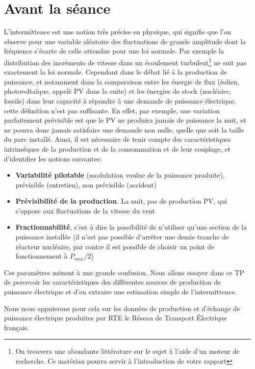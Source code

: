 \documentclass[12pt,a4,french]{article}
\begin{document}
\section{Avant la séance}
\label{sec:avant}
L'intermittence est une notion très précise en physique, qui signifie que
l'on observe pour une variable aléatoire des fluctuations de grande amplitude dont la fréquence s'écarte de celle attendue pour une loi normale. Par exemple la distribution des incréments de vitesse dans un écoulement turbulent\footnote{On trouvera une abondante littérature sur le sujet à l'aide d'un moteur de recherche. Ce matériau pourra servir à l'introduction de votre rapport} ne suit pas exactement la loi normale.
Cependant dans le débat lié à
la production de puissance, et notamment dans la comparaison entre les
énergie de flux (éolien, photovoltaïque, appelé PV dans la suite) et les énergies de stock (nucléaire,
fossile) dans leur capacité à répondre à une demande de puissance
électrique, cette définition n'est pas suffisante. En effet, par exemple,
une variation parfaitement prévisible est que le PV ne produira jamais de
puissance la nuit, et ne pourra donc jamais satisfaire une demande non nulle, quelle que
soit la taille du parc installé. Ainsi, il est nécessaire de tenir compte
des caractéristiques intrinsèques de la production et de la consommation et
de leur couplage, et d'identifier les notions suivantes:
\begin{itemize}
  \item \textbf{Variabilité pilotable} (modulation voulue de la puissance produite), prévisible (entretien), non prévisible (accident)
  
  \item \textbf{Prévisibilité de la production}. La nuit, pas de production PV, qui s'oppose aux fluctuations de la vitesse du vent
  
  \item \textbf{Fractionnabilité}, c'est à dire la possibilité de n'utiliser qu'une
  section de la puissance installée (il n'est pas possible d'arrêter une demie tranche de réacteur nucléaire, par contre il est possible de choisir un point de fonctionnement à $P_{max}/2$)  
\end{itemize}
Ces paramètres mènent à une grande confusion. Nous allons essayer dans ce
TP de percevoir les caractéristiques des différentes sources de production
de puissance électrique et d'en extraire une estimation simple de
l'intermittence.

Nous nous appuierons pour cela sur les données de production et d'échange de puissance électrique produites par RTE le Réseau de Transport Électrique français.
\end{document}
